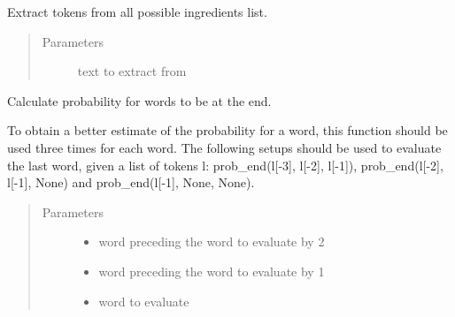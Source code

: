 \documentclass[letterpaper,10pt,english]{sphinxmanual}
\begin{document}
\begin{fulllineitems}
\begin{fulllineitems}
\begin{quote}
\begin{description}
\end{description}\end{quote}

\end{fulllineitems}


\begin{fulllineitems}
\label{\detokenize{api:ingredient_extractor.IngredientExtractor.extract_zutaten}}
Extract tokens from all possible ingredients list.
\begin{quote}\begin{description}
\item[{Parameters}] \leavevmode
{} \textendash{} text to extract from

\end{description}\end{quote}

\end{fulllineitems}


\begin{fulllineitems}
\label{\detokenize{api:ingredient_extractor.IngredientExtractor.prob_end}}
Calculate probability for words to be at the end.

To obtain a better estimate of the probability for a word,
this function should be used three times for each word. The
following setups should be used to evaluate the last word,
given a list of tokens l: prob\_end(l{[}-3{]}, l{[}-2{]}, l{[}-1{]}),
prob\_end(l{[}-2{]}, l{[}-1{]}, None) and prob\_end(l{[}-1{]}, None, None).
\begin{quote}\begin{description}
\item[{Parameters}] \leavevmode\begin{itemize}
\item {} 
 \textendash{} word preceding the word to evaluate by 2

\item {} 
 \textendash{} word preceding the word to evaluate by 1

\item {} 
 \textendash{} word to evaluate


\end{itemize}
\end{description}
\end{quote}
\end{fulllineitems}
\end{fulllineitems}
\end{document}
